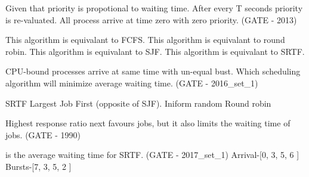 

\begin{minipage}{\linewidth}

  \question  Given that priority is propotional to waiting time. After every T seconds priority is re-valuated.
             All process arrive at time zero with zero priority. (GATE - 2013)

  \begin{choices}
    \choice This algorithm is equivalant to FCFS.
    \choice This algorithm is equivalant to round robin.
    \choice This algorithm is equivalant to SJF.
    \choice This algorithm is equivalant to SRTF.
  \end{choices}


\end{minipage}



\begin{minipage}{\linewidth}

  \question  CPU-bound processes arrive at same time with un-equal bust.
            Which scheduling algorithm will minimize average waiting time. (GATE - 2016\_set\_1)

  \begin{choices}
    \choice SRTF
    \choice Largest Job First (opposite of SJF).
    \choice Iniform random
    \choice Round robin
  \end{choices}

\end{minipage}



\begin{minipage}{\linewidth}


  \question Highest response ratio next favours   jobs, but it also limits the
            waiting time of  jobs. (GATE - 1990)

\end{minipage}



\begin{minipage}{\linewidth}

  \question \fillin[.........] is the average waiting time for SRTF. (GATE - 2017\_set\_1) \newline
            [P1, P2, P3, P4]
            Arrival-[0,  3,  5,  6 ]
            Bursts-[7,  3,  5,  2 ]

\end{minipage}

